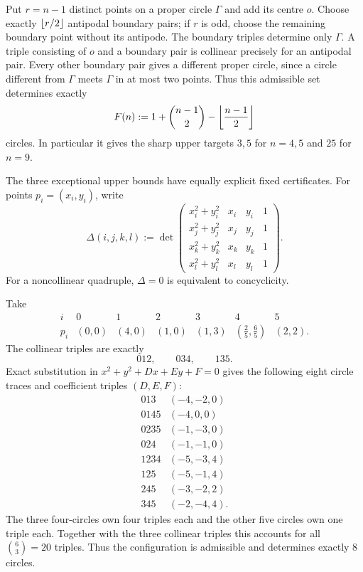 \begin{construction}\label{con:circle-centre}
Put $r=n-1$ distinct points on a proper circle $\Gamma$ and add its centre
$o$.  Choose exactly $\left\lfloor r/2\right\rfloor$ antipodal boundary pairs; if $r$ is odd,
choose the remaining boundary point without its antipode.  The boundary
triples determine only $\Gamma$.  A triple consisting of $o$ and a boundary
pair is collinear precisely for an antipodal pair.  Every other boundary
pair gives a different proper circle, since a circle different from
$\Gamma$ meets $\Gamma$ in at most two points.  Thus this admissible set
determines exactly
\begin{equation}\label{eq:circle-centre-count}
 F(n):=1+\binom{n-1}{2}-\left\lfloor \frac{n-1}{2}\right\rfloor
\end{equation}
 circles.  In particular it gives the sharp upper targets $3,5$ for
 $n=4,5$ and $25$ for $n=9$.
\end{construction}

 The three exceptional upper bounds have equally explicit fixed certificates.
For points $p_i=(x_i,y_i)$, write
\begin{equation}\label{eq:concyclic-determinant}
 \Delta(i,j,k,l):=
 \det\begin{pmatrix}
 x_i^2+y_i^2&x_i&y_i&1\\
 x_j^2+y_j^2&x_j&y_j&1\\
 x_k^2+y_k^2&x_k&y_k&1\\
 x_l^2+y_l^2&x_l&y_l&1
 \end{pmatrix}.
\end{equation}
For a noncollinear quadruple, $\Delta=0$ is equivalent to concyclicity.

\begin{construction}
\label{con:six-upper}
Take
\[
\begin{array}{c|cccccc}
i&0&1&2&3&4&5\\ \hline
p_i&(0,0)&(4,0)&(1,0)&(1,3)&
 (\tfrac25,\tfrac65)&(2,2).
\end{array}
\]
The collinear triples are exactly
\[
 012,\qquad034,\qquad135.
\]
Exact substitution in $x^2+y^2+Dx+Ey+F=0$ gives the following eight
circle traces and coefficient triples $(D,E,F)$:
\[
\begin{array}{c|c}
013&(-4,-2,0)\\
0145&(-4,0,0)\\
0235&(-1,-3,0)\\
024&(-1,-1,0)\\
1234&(-5,-3,4)\\
125&(-5,-1,4)\\
245&(-3,-2,2)\\
345&(-2,-4,4).
\end{array}
\]
The three four-circles own four triples each and the other five circles own
one triple each.  Together with the three collinear triples this accounts for
all $\binom63=20$ triples.  Thus the configuration is admissible and
determines exactly $8$ circles.
\end{construction}

